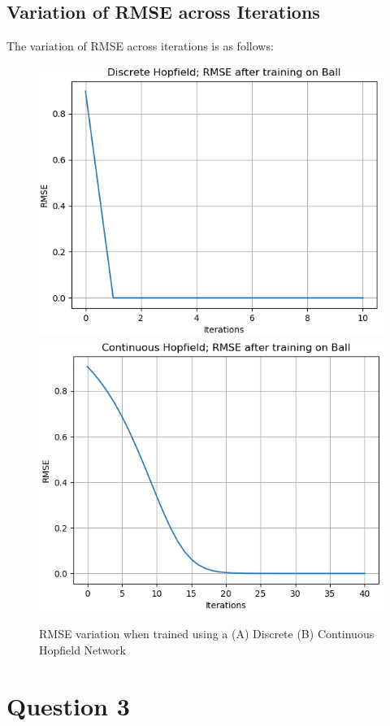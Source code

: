 \documentclass[12pt,a4paper]{article}
\begin{document}
\subsection{Variation of RMSE across Iterations}
The variation of RMSE across iterations is as follows:
\begin{figure}[H]
\includegraphics[scale=0.45]{images/dhn_ball.png}
\includegraphics[scale=0.45]{images/chn_0_ball.png}
\caption{RMSE variation when trained using a (A) Discrete (B) Continuous Hopfield Network}
\end{figure}

\break
\section{Question 3}
\end{document}
